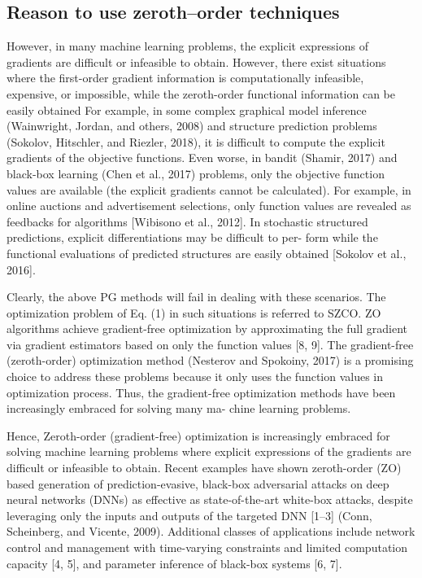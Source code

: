 \documentclass{article}
\theoremstyle{definition}
\theoremstyle{remark}
\begin{document}
\subsection{Reason to use zeroth--order techniques}
{\color{Green}
However, in many machine learning problems, the explicit expressions of gradients are difficult or infeasible to
obtain. 
{\color{RubineRed}
However, there exist situations where the first-order gradient information is computationally infeasible, expensive, or impossible,
while the zeroth-order functional information can be easily obtained
}
For example, in some complex graphical model inference (Wainwright, Jordan, and others, 2008) and structure prediction problems (Sokolov, Hitschler, and Riezler,
2018), it is difficult to compute the explicit gradients of
the objective functions. Even worse, in bandit (Shamir, 2017) and black-box learning (Chen et al., 2017) problems, only the objective function values are available (the explicit gradients cannot be calculated). 
{\color{RubineRed}
 For example, in online auctions and advertisement
selections, only function values are revealed as feedbacks for algorithms [Wibisono et al., 2012]. In stochastic structured predictions, explicit differentiations may be difficult to per-
form while the functional evaluations of predicted structures are easily obtained [Sokolov et al., 2016]. }

Clearly, the above
PG methods will fail in dealing with these scenarios. 
{\color{RubineRed} The optimization problem of Eq. (1) in such situations is referred to SZCO.}
{\color{Brown} ZO algorithms achieve gradient-free optimization by approximating the full gradient via gradient estimators based on only the function values [8, 9].} The gradient-free (zeroth-order) optimization method (Nesterov
and Spokoiny, 2017) is a promising choice to address these problems because it only uses the function values in optimization process. Thus, the gradient-free optimization methods have been increasingly embraced for solving many ma-
chine learning problems.
}
{\color{Brown}
Hence, Zeroth-order (gradient-free) optimization is increasingly embraced for solving machine learning
problems where explicit expressions of the gradients are difficult or infeasible to obtain. Recent examples have shown zeroth-order (ZO) based generation of prediction-evasive, black-box adversarial attacks on deep neural networks (DNNs) as effective as state-of-the-art white-box attacks, despite leveraging only the inputs and outputs of the targeted DNN [1–3] {\color{Green} (Conn, Scheinberg, and Vicente, 2009)}. Additional classes of applications include network control and management with time-varying constraints and limited computation capacity [4, 5], and parameter inference of black-box systems [6, 7]. 
}
\end{document}
